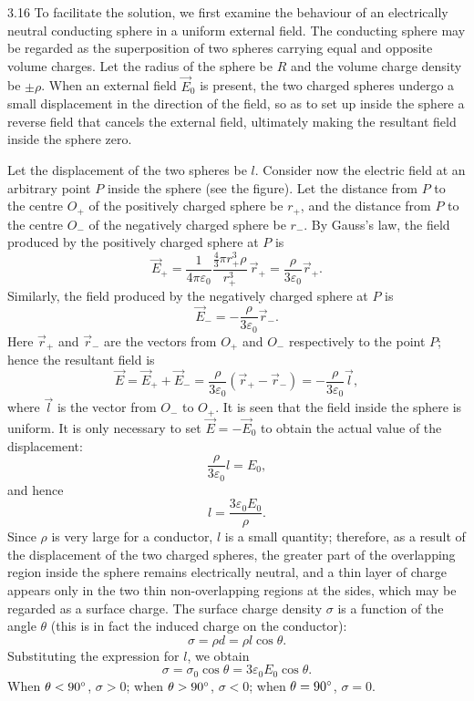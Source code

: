 \begin{solution}{3.16}
To facilitate the solution, we first examine the behaviour of an electrically neutral conducting sphere in a uniform external field. The conducting sphere may be regarded as the superposition of two spheres carrying equal and opposite volume charges. Let the radius of the sphere be $R$ and the volume charge density be $\pm\rho$. When an external field $\vec{E}_0$ is present, the two charged spheres undergo a small displacement in the direction of the field, so as to set up inside the sphere a reverse field that cancels the external field, ultimately making the resultant field inside the sphere zero.

Let the displacement of the two spheres be $l$. Consider now the electric field at an arbitrary point $P$ inside the sphere (see the figure). Let the distance from $P$ to the centre $O_+$ of the positively charged sphere be $r_+$, and the distance from $P$ to the centre $O_-$ of the negatively charged sphere be $r_-$. By Gauss's law, the field produced by the positively charged sphere at $P$ is
\[
\vec{E}_+=\frac{1}{4\pi\varepsilon_0}\frac{\frac{4}{3}\pi r_+^3\rho}{r_+^3}\,\vec{r}_+
=\frac{\rho}{3\varepsilon_0}\vec{r}_+.
\]
Similarly, the field produced by the negatively charged sphere at $P$ is
\[
\vec{E}_-=-\frac{\rho}{3\varepsilon_0}\vec{r}_-.
\]
Here $\vec{r}_+$ and $\vec{r}_-$ are the vectors from $O_+$ and $O_-$ respectively to the point $P$; hence the resultant field is
\[
\vec{E}=\vec{E}_++\vec{E}_-
=\frac{\rho}{3\varepsilon_0}\left(\vec{r}_+-\vec{r}_-\right)
=-\frac{\rho}{3\varepsilon_0}\vec{l},
\]
where $\vec{l}$ is the vector from $O_-$ to $O_+$. It is seen that the field inside the sphere is uniform. It is only necessary to set $\vec{E}=-\vec{E}_0$ to obtain the actual value of the displacement:
\[
\frac{\rho}{3\varepsilon_0}l=E_0,
\]
and hence
\[
l=\frac{3\varepsilon_0E_0}{\rho}.
\]
Since $\rho$ is very large for a conductor, $l$ is a small quantity; therefore, as a result of the displacement of the two charged spheres, the greater part of the overlapping region inside the sphere remains electrically neutral, and a thin layer of charge appears only in the two thin non-overlapping regions at the sides, which may be regarded as a surface charge. The surface charge density $\sigma$ is a function of the angle $\theta$ (this is in fact the induced charge on the conductor):
\[
\sigma=\rho d=\rho l\cos\theta.
\]
Substituting the expression for $l$, we obtain
\begin{equation}
\sigma=\sigma_0\cos\theta=3\varepsilon_0E_0\cos\theta. \tag{1}
\end{equation}
When $\theta<90^{\circ}$, $\sigma>0$; when $\theta>90^{\circ}$, $\sigma<0$; when $\theta=90^{\circ}$, $\sigma=0$.


\end{solution}
